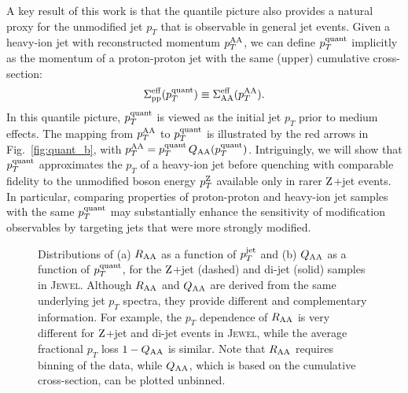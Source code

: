 \documentclass[aps,prl,twocolumn,preprintnumbers,superscriptaddress,showpacs,floatfix, nofootinbib]{revtex4-1}
\newcommand{\Z}{\rm Z}
\newcommand{\pTZ}{p_T^{\rm Z}}
\newcommand{\pTHI}{p_T^{\rm AA}}
\newcommand{\pTq}{p_T^{\rm quant}}
\newcommand{\Fig}[1]{Fig.~\ref{#1}}
\begin{document}
A key result of this work is that the quantile picture also provides a natural proxy for the unmodified jet $p_T$ that is observable in general jet events.
%
Given a heavy-ion jet with reconstructed momentum $\pTHI$, we can define $\pTq$ implicitly as the momentum of a proton-proton jet with the same (upper) cumulative cross-section:
%
\begin{equation}
	\label{eq:pTquant}
	\Sigma^{\rm eff}_{\rm pp}(\pTq) \equiv \Sigma^{\rm eff}_{\rm AA}(\pTHI).
\end{equation}
%
In this quantile picture, $\pTq$ is viewed as the initial jet $p_T$ prior to medium effects.
%
The mapping from $\pTHI$ to $\pTq$ is illustrated by the red arrows in \Fig{fig:quant_b}, with $\pTHI = \pTq \, Q_{\rm AA}(\pTq)$.
%
Intriguingly, we will show that $\pTq$ approximates the $p_T$ of a heavy-ion jet before quenching with comparable fidelity to the unmodified boson energy $\pTZ$ available only in rarer $\Z$+jet events. 
%
In particular, comparing properties of proton-proton and heavy-ion jet samples with the same $\pTq$ may substantially enhance the sensitivity of modification observables by targeting jets that were more strongly modified.


\begin{figure*}
\caption{Distributions of (a) $R_{\rm AA}$ as a function of $p_T^{\rm jet}$ and (b) $Q_{\rm AA}$ as a function of $\pTq$, for the $\Z$+jet (dashed) and di-jet (solid) samples in \textsc{Jewel}.
%
Although $R_{\rm AA}$ and $Q_{\rm AA}$ are derived from the same underlying jet $p_T$ spectra, they provide different and complementary information.
%
For example, the $p_T$ dependence of $R_{\rm AA}$ is very different for $\Z$+jet and di-jet events in \textsc{Jewel}, while the average fractional $p_T$ loss $1-Q_{\rm AA}$ is similar.
%
Note that $R_{\rm AA}$ requires binning of the data, while $Q_{\rm AA}$, which is based on the cumulative cross-section, can be plotted unbinned.
}
\label{fig:pTloss}
\end{figure*}
\end{document}
